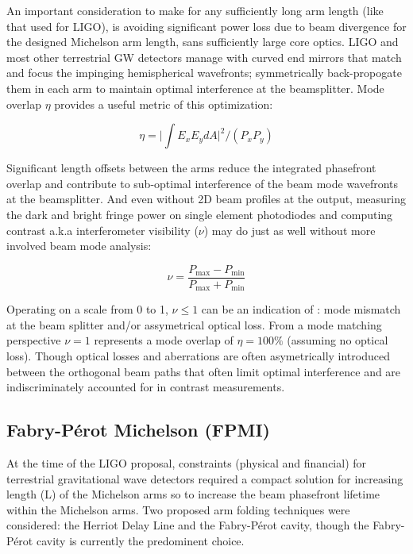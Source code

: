 An important consideration to make for any sufficiently long arm length (like that used for LIGO), is avoiding significant power loss due to beam divergence for the designed Michelson arm length, sans sufficiently large core optics. LIGO and most other terrestrial GW detectors manage with curved end mirrors that match and focus the impinging hemispherical wavefronts; symmetrically back-propogate them in each arm to maintain optimal interference at the beamsplitter. Mode overlap $\eta$ provides a useful metric of this optimization: 

\begin{equation}\label{eq:modeoverlap}
	\eta = \bigg|\int E_x E_y dA \bigg|^{2} \bigg/ (P_x P_y) 
\end{equation}

Significant length offsets between the arms reduce the integrated phasefront overlap and contribute to sub-optimal interference of the beam mode wavefronts at the beamsplitter. And even without 2D beam profiles at the output, measuring the dark and bright fringe power on single element photodiodes and computing contrast a.k.a interferometer visibility ($\nu$) may do just as well without more involved beam mode analysis:

\begin{equation}\label{eq:contrast}
	\nu = \frac{P_\mathrm{max} - P_\mathrm{min}}{P_\mathrm{max} + P_\mathrm{min}}
\end{equation}

Operating on a scale from 0 to 1, $\nu \le 1$ can be an indication of : mode mismatch at the beam splitter and/or assymetrical optical loss. From a mode matching perspective $\nu = 1$ represents a mode overlap of $\eta = 100 \%$ (assuming no optical loss).  Though optical losses and aberrations are often asymetrically introduced between the orthogonal beam paths that often limit optimal interference and are indiscriminately accounted for in contrast measurements.  

\subsection{Fabry-P\'{e}rot Michelson (FPMI)}
At the time of the LIGO proposal, constraints (physical and financial) for terrestrial gravitational wave detectors required a compact solution for increasing length (L) of the Michelson arms so to increase the beam phasefront lifetime within the Michelson arms. Two proposed arm folding techniques were considered: the Herriot Delay Line and the Fabry-P\'{e}rot cavity, though the Fabry-P\'{e}rot cavity is currently the predominent choice.


